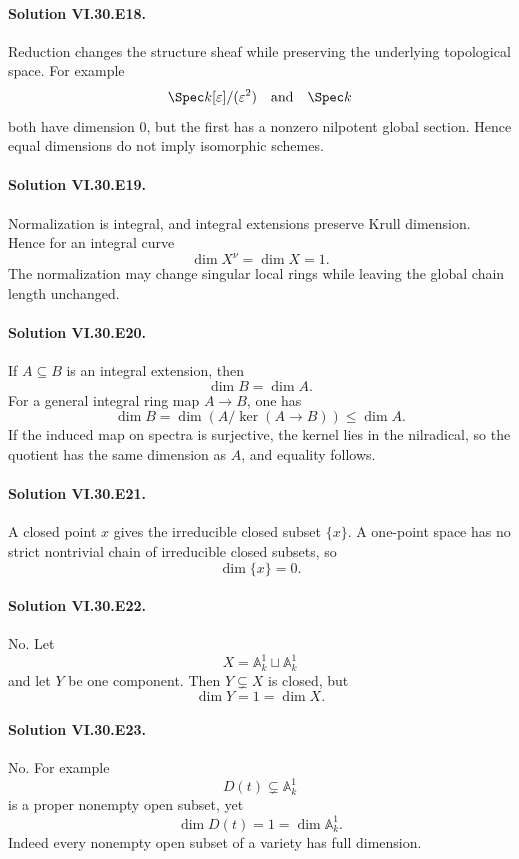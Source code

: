 \paragraph{Solution VI.30.E18.}
Reduction changes the structure sheaf while preserving the underlying topological space. For example
\[
\Spec k[\varepsilon]/(\varepsilon^2)
\quad\text{and}\quad
\Spec k
\]
both have dimension \(0\), but the first has a nonzero nilpotent global section. Hence equal dimensions do not
imply isomorphic schemes.

\paragraph{Solution VI.30.E19.}
Normalization is integral, and integral extensions preserve Krull dimension. Hence for an integral curve
\[
\boxed{\dim X^\nu=\dim X=1}.
\]
The normalization may change singular local rings while leaving the global chain length unchanged.

\paragraph{Solution VI.30.E20.}
If \(A\subseteq B\) is an integral extension, then
\[
\boxed{\dim B=\dim A}.
\]
For a general integral ring map \(A\to B\), one has
\[
\dim B=\dim(A/\ker(A\to B))\le\dim A.
\]
If the induced map on spectra is surjective, the kernel lies in the nilradical, so the quotient has the same
dimension as \(A\), and equality follows.

\paragraph{Solution VI.30.E21.}
A closed point \(x\) gives the irreducible closed subset \(\{x\}\). A one-point space has no strict nontrivial
chain of irreducible closed subsets, so
\[
\boxed{\dim\{x\}=0}.
\]

\paragraph{Solution VI.30.E22.}
No. Let
\[
X=\mathbb A^1_k\sqcup\mathbb A^1_k
\]
and let \(Y\) be one component. Then \(Y\subsetneq X\) is closed, but
\[
\dim Y=1=\dim X.
\]

\paragraph{Solution VI.30.E23.}
No. For example
\[
D(t)\subsetneq\mathbb A^1_k
\]
is a proper nonempty open subset, yet
\[
\dim D(t)=1=\dim\mathbb A^1_k.
\]
Indeed every nonempty open subset of a variety has full dimension.

